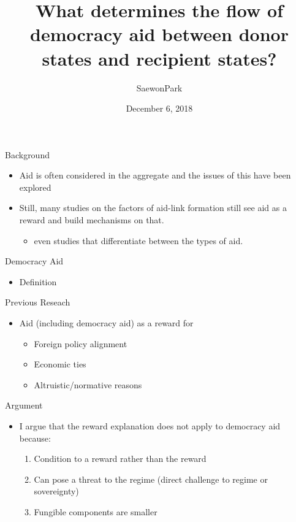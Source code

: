 \documentclass[ignorenonframetext,]{beamer}
\title{What determines the flow of democracy aid between donor states and
recipient states?}
\author{SaewonPark}
\date{December 6, 2018}
\providecommand{\tightlist}{%
  \setlength{\itemsep}{0pt}\setlength{\parskip}{0pt}}
\begin{document}
\frame{\titlepage}

\begin{frame}{Background}
\protect\hypertarget{background}{}

\begin{itemize}
\tightlist
\item
  Aid is often considered in the aggregate and the issues of this have
  been explored
\item
  Still, many studies on the factors of aid-link formation still see aid
  as a reward and build mechanisms on that.

  \begin{itemize}
  \tightlist
  \item
    even studies that differentiate between the types of aid.
  \end{itemize}
\end{itemize}

\end{frame}

\begin{frame}{Democracy Aid}
\protect\hypertarget{democracy-aid}{}

\begin{itemize}
\tightlist
\item
  Definition
\end{itemize}

\end{frame}

\begin{frame}{Previous Reseach}
\protect\hypertarget{previous-reseach}{}

\begin{itemize}
\tightlist
\item
  Aid (including democracy aid) as a reward for

  \begin{itemize}
  \tightlist
  \item
    Foreign policy alignment
  \item
    Economic ties
  \item
    Altruistic/normative reasons
  \end{itemize}
\end{itemize}

\end{frame}

\begin{frame}{Argument}
\protect\hypertarget{argument}{}

\begin{itemize}
\tightlist
\item
  I argue that the reward explanation does not apply to democracy aid
  because:

  \begin{enumerate}
  \tightlist
  \item
    Condition to a reward rather than the reward
  \item
    Can pose a threat to the regime (direct challenge to regime or
    sovereignty)
  \item
    Fungible components are smaller
  \end{enumerate}
\end{itemize}

\end{frame}
\end{document}

